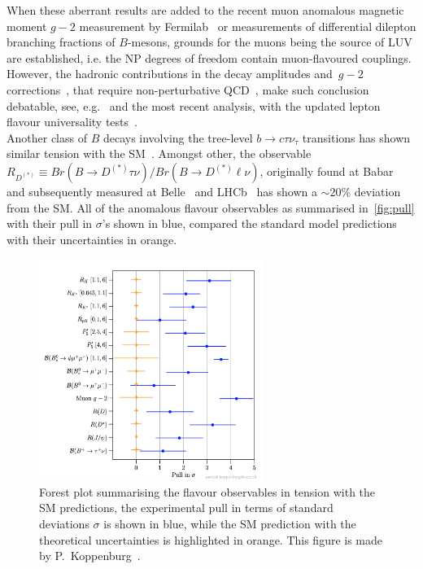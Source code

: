 When these aberrant results are added to the recent muon anomalous magnetic moment $g-2$ measurement by Fermilab~\cite{Muong-2:2021ojo} or measurements of differential dilepton branching fractions of $B$-mesons,  grounds for the muons being the source of LUV are established, i.e.  the NP degrees of freedom contain muon-flavoured couplings.  However, the hadronic contributions  in the decay amplitudes and~$g-2$ corrections~\cite{Khodjamirian:2010vf,Lyon:2014hpa,Chobanova:2017ghn,Blake:2017fyh,Bobeth:2017vxj}, that require non-perturbative QCD~\cite{Jager:2014rwa,Ciuchini:2015qxb,Arbey:2018ics,Chrzaszcz:2018yza}, make such conclusion debatable, see, e.g.~\cite{Ciuchini:2018anp,Hurth:2020rzx} and the most recent analysis, with the updated lepton flavour universality tests~\cite{Ciuchini:2021smi}. \\
Another class of $B$ decays involving the tree-level $ b \to c \tau \nu_\tau$ transitions has shown similar tension with the SM~\cite{Azatov:2018knx,Alok:2019uqc,Murgui:2019czp,Shi:2019gxi}. Amongst other, the observable $R_{D^{(*)}} \equiv Br(B \to D^{(*)} \tau \nu) / Br(B \to D^{(*)} \ell \nu)$, originally found at Babar~\cite{Lees:2013uzd} and subsequently measured at Belle~\cite{Huschle:2015rga} and LHCb~\cite{Aaij:2017uff} has shown a $\sim 20\%$ deviation from the SM. All of the anomalous flavour observables as summarised in~\autoref{fig:pull} with their pull in $\sigma$'s shown in blue, compared the standard model predictions with their uncertainties in orange. \\
 \begin{figure}[ht!]
 	\centering
 	\includegraphics[width=0.65\textwidth]{fig/pull}
 	\caption{ Forest plot summarising the flavour observables in tension with the SM predictions, the experimental pull in terms of standard deviations $\sigma$ is shown in blue, while the SM prediction with the theoretical uncertainties is highlighted in orange. This figure is made by P.~Koppenburg~\cite{Koppenburg:2767155}. }
 	\label{fig:pull}
 \end{figure}
